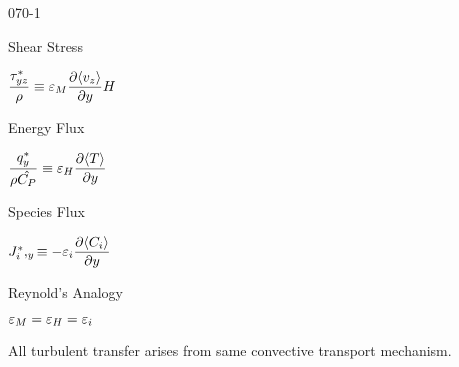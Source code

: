\begin {mitframe}{070-1}

              
\begin{listone}
\item
		\begin {listtwo}
\item Shear Stress
					\begin{listthree}
            		\item $\dfrac{\torque^{*}_{yz}}{\dens}\equiv\varepsilon_{M}\dfrac{\partial\langle\vvel_{z}\rangle}{\partial{y}}\enthalpy$
            

			  		\end{listthree}

			\item Energy Flux

					\begin{listthree}
            		\item $\dfrac{\heatflux_{y}^*}{\dens\hat{\cp}}\equiv\varepsilon_{\enthalpy}\dfrac{\partial\langle\Temp\rangle}{\partial{y}}$
           				\end{listthree}
            
			\item Species Flux

			\begin{listthree}
            
            \item $ \molspecflux^*,_{y}\equiv-\varepsilon_{\state}\dfrac{\partial\langle\conc_{\state}\rangle}{\partial{y}}$
            
            \end{listthree}

			\end{listtwo}
 \item Reynold's Analogy
 
 			\begin{listtwo}
            
            \item $\varepsilon_M=\varepsilon_{\enthalpy}=\varepsilon_{\state}$
            			\begin{listthree}
                        
                        \item All turbulent transfer arises from same convective transport mechanism.
                        

						\end{listthree}
\end{listtwo}
\end{listone}

\end{mitframe}